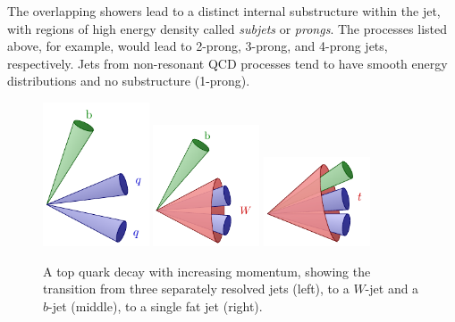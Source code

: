 The overlapping showers lead to a distinct internal substructure within the jet, with regions of high energy density called \textit{subjets} or \textit{prongs}.
The processes listed above, for example, would lead to 2-prong, 3-prong, and 4-prong jets, respectively.
Jets from non-resonant QCD processes tend to have smooth energy distributions and no substructure (1-prong).

\begin{figure}[htb]
    \centering
    \includegraphics[width=0.28\textwidth]{Feynman/sep.pdf}
    \hfill
    \includegraphics[width=0.28\textwidth]{Feynman/W.pdf}
    \hfill
    \includegraphics[width=0.28\textwidth]{Feynman/top.pdf}
    \caption{A top quark decay with increasing momentum, showing the transition from three separately resolved jets (left), to a $W$-jet and a $b$-jet (middle), to a single fat jet (right).}
    \label{fig:jet_topologies}
\end{figure}

